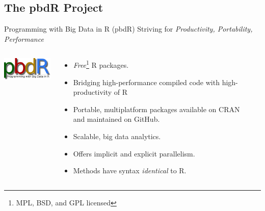 \subsection{The pbdR Project}
\makesubcontentsslidessec


\begin{frame}
  \begin{block}{Programming with Big Data in R (pbdR)}
       \centering Striving for \emph{Productivity, Portability, Performance}\\[.4cm]\pause
  \begin{columns}[onlytextwidth]
    \begin{column}{0.30\textwidth}
      \centering
       \includegraphics[width=3.4cm]{../common/pics/simple}\\[.2cm]
    \end{column}
    \begin{column}{0.65\textwidth}
  \begin{itemize}[<+-|alert@+>]
    \item \emph{Free}\footnote{MPL, BSD, and GPL licensed} R packages.
    \item Bridging high-performance compiled code with high-productivity of R
    \item Portable, multiplatform packages available on CRAN and maintained on 
GitHub.
    \item Scalable, big data analytics.
    \item Offers implicit and explicit parallelism.
    \item Methods have syntax \emph{identical} to R.
  \end{itemize}
    \end{column}
​  \end{columns}
\end{block}
\end{frame}



